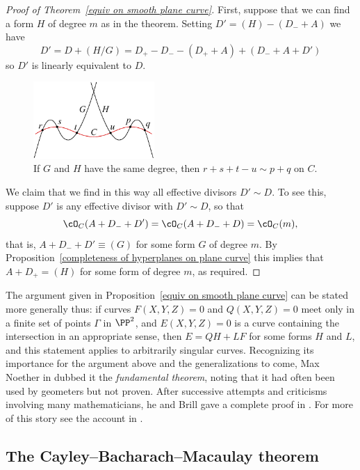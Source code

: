 \begin{proof}[Proof of Theorem~\ref{equiv on smooth plane curve}]
First, suppose that we can find a form $H$ of degree $m$ as in the theorem.
Setting $D' = (H) -(D_{-}+A)$ we have
$$
D' = D + (H/G) = D_{+}- D_{-} - (D_{+}+A)+(D_{-}+A+D')
$$
so $D'$ is linearly equivalent to $D$.

\begin{figure}
\centerline{\includegraphics[height=1.15in]{"main/Fig14-1"}}
\nointerlineskip
\vskip-15pt
\centerline{\color{white} \vrule width 100pt height 12pt}
\vskip-3pt
\caption{If $G$ and $H$ have the same degree, then $r+s+t-u\sim p+q$ on $C$.}
\label{Fig14.3}
\end{figure}

We claim that we find in this way all effective divisors $D' \sim D$.
To see this, suppose $D'$ is any effective divisor with $D' \sim D$, so that
$$
\cO_C(A+D_{-}+D') = \cO_C(A+D_{-}+D)  = \cO_C(m),
$$
that is, $A+D_{-}+D' \equiv (G)$ for some form $G$ of degree $m$. By Proposition~\ref{completeness of hyperplanes on plane curve}
this implies that $A+D_{+} = (H)$ for some form of degree $m$, as required.
\end{proof}


The argument given in Proposition~\ref{equiv on smooth plane curve} can be stated more generally thus:  if curves $F(X,Y,Z)=0$ and $Q(X,Y,Z)=0$
meet only in a finite set of points $\Gamma$ in $\PP^{2}$, and $E(X,Y,Z) = 0$ is a curve containing the intersection in an appropriate sense,
then $E = QH +LF$ for some forms $H$ and $L$, and this statement
applies to arbitrarily singular curves. Recognizing its importance for
the argument above and the generalizations to come, Max Noether
%
in \cite{Noether1873} dubbed it the \emph{fundamental theorem},
%
noting that it had often been used by geometers but not proven. After successive attempts and
%
criticisms involving many mathematicians, he and Brill gave a complete
proof in \cite{Brill-NoetherOriginal}. For more of this story see the
account in \cite{eisenbud-gray}.

\subsection{The Cayley--Bacharach--Macaulay theorem}\label{CB section}

